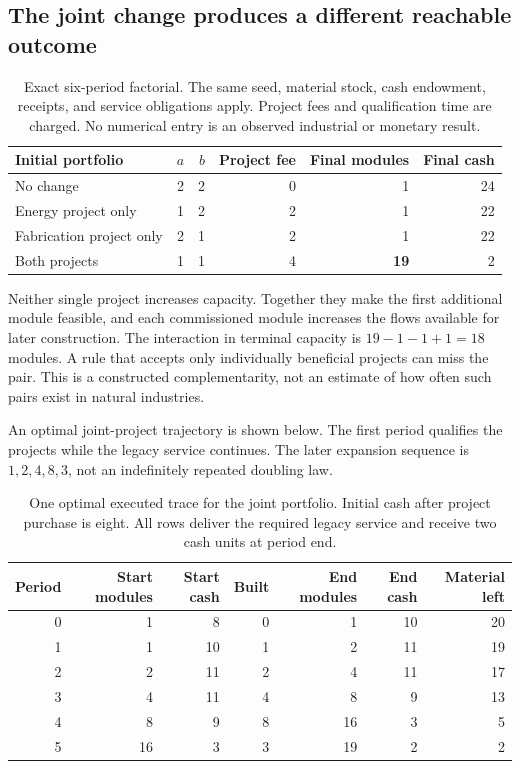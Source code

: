 \documentclass[11pt,letterpaper]{article}
\newcommand{\1}{\mathbf 1}
\theoremstyle{remark}\newtheorem{remark}{Remark}[section]
\begin{document}
\subsection{The joint change produces a different reachable outcome}
\begin{table}[htbp]\centering\small
\caption{Exact six-period factorial. The same seed, material stock, cash endowment, receipts, and service obligations apply. Project fees and qualification time are charged. No numerical entry is an observed industrial or monetary result.}
\begin{tabularx}{\linewidth}{@{}Yrrrrr@{}}\toprule
Initial portfolio & $a$ & $b$ & Project fee & Final modules & Final cash\\\midrule
No change & 2 & 2 & 0 & 1 & 24\\
Energy project only & 1 & 2 & 2 & 1 & 22\\
Fabrication project only & 2 & 1 & 2 & 1 & 22\\
Both projects & 1 & 1 & 4 & \textbf{19} & 2\\\bottomrule
\end{tabularx}\label{tab:factorial}
\end{table}

Neither single project increases capacity. Together they make the first additional module feasible, and each commissioned module increases the flows available for later construction. The interaction in terminal capacity is $19-1-1+1=18$ modules. A rule that accepts only individually beneficial projects can miss the pair. This is a constructed complementarity, not an estimate of how often such pairs exist in natural industries.

An optimal joint-project trajectory is shown below. The first period qualifies the projects while the legacy service continues. The later expansion sequence is $1,2,4,8,3$, not an indefinitely repeated doubling law.

\begin{table}[htbp]\centering\small
\caption{One optimal executed trace for the joint portfolio. Initial cash after project purchase is eight. All rows deliver the required legacy service and receive two cash units at period end.}
\begin{tabular}{@{}rrrrrrr@{}}\toprule
Period & Start modules & Start cash & Built & End modules & End cash & Material left\\\midrule
0 & 1 & 8 & 0 & 1 & 10 & 20\\
1 & 1 & 10 & 1 & 2 & 11 & 19\\
2 & 2 & 11 & 2 & 4 & 11 & 17\\
3 & 4 & 11 & 4 & 8 & 9 & 13\\
4 & 8 & 9 & 8 & 16 & 3 & 5\\
5 & 16 & 3 & 3 & 19 & 2 & 2\\\bottomrule
\end{tabular}\label{tab:trace}
\end{table}
\end{document}
